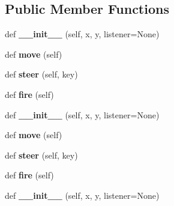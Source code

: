 \subsection*{Public Member Functions}
\begin{DoxyCompactItemize}
\item 
def {\bfseries \+\_\+\+\_\+init\+\_\+\+\_\+} (self, x, y, listener=None)\hypertarget{classSpaceship_1_1Spaceship_a0ce8d5216e02a15f018cdb852a702a00}{}\label{classSpaceship_1_1Spaceship_a0ce8d5216e02a15f018cdb852a702a00}

\item 
def {\bfseries move} (self)\hypertarget{classSpaceship_1_1Spaceship_a9ed1701b8506b3287a3c0f376965eaa3}{}\label{classSpaceship_1_1Spaceship_a9ed1701b8506b3287a3c0f376965eaa3}

\item 
def {\bfseries steer} (self, key)\hypertarget{classSpaceship_1_1Spaceship_aaad85580a083d4fbb6c839f98224a6c5}{}\label{classSpaceship_1_1Spaceship_aaad85580a083d4fbb6c839f98224a6c5}

\item 
def {\bfseries fire} (self)\hypertarget{classSpaceship_1_1Spaceship_a7cf6faeb7488ab1a77fc5668076c1f35}{}\label{classSpaceship_1_1Spaceship_a7cf6faeb7488ab1a77fc5668076c1f35}

\item 
def {\bfseries \+\_\+\+\_\+init\+\_\+\+\_\+} (self, x, y, listener=None)\hypertarget{classSpaceship_1_1Spaceship_a0ce8d5216e02a15f018cdb852a702a00}{}\label{classSpaceship_1_1Spaceship_a0ce8d5216e02a15f018cdb852a702a00}

\item 
def {\bfseries move} (self)\hypertarget{classSpaceship_1_1Spaceship_a9ed1701b8506b3287a3c0f376965eaa3}{}\label{classSpaceship_1_1Spaceship_a9ed1701b8506b3287a3c0f376965eaa3}

\item 
def {\bfseries steer} (self, key)\hypertarget{classSpaceship_1_1Spaceship_aaad85580a083d4fbb6c839f98224a6c5}{}\label{classSpaceship_1_1Spaceship_aaad85580a083d4fbb6c839f98224a6c5}

\item 
def {\bfseries fire} (self)\hypertarget{classSpaceship_1_1Spaceship_a7cf6faeb7488ab1a77fc5668076c1f35}{}\label{classSpaceship_1_1Spaceship_a7cf6faeb7488ab1a77fc5668076c1f35}

\item 
def {\bfseries \+\_\+\+\_\+init\+\_\+\+\_\+} (self, x, y, listener=None)\hypertarget{classSpaceship_1_1Spaceship_a0ce8d5216e02a15f018cdb852a702a00}{}\label{classSpaceship_1_1Spaceship_a0ce8d5216e02a15f018cdb852a702a00}


\end{DoxyCompactItemize}
